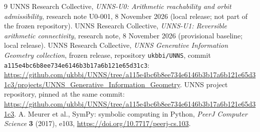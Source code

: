 \documentclass[11pt]{article}
\theoremstyle{definition}
\begin{document}
\begin{thebibliography}{9}\small
{} UNNS Research Collective, \emph{UNNS-U0: Arithmetic reachability and orbit admissibility}, research note U0-001, 8 November 2026
(local release; not part of the frozen repository).
 UNNS Research Collective, \emph{UNNS-U1: Reversible arithmetic connectivity}, research note, 8 November 2026
(provisional baseline; local release).
 UNNS Research Collective, \emph{UNNS Generative Information Geometry collection}, frozen release, repository \texttt{ukbbi/UNNS}, commit
\texttt{a115e4bc6b8ee734e6146b3b17a6b121e65d31c3}:
\url{https://github.com/ukbbi/UNNS/tree/a115e4bc6b8ee734e6146b3b17a6b121e65d31c3/projects/UNNS_Generative_Information_Geometry}.
 UNNS project repository, pinned at the same commit:
\url{https://github.com/ukbbi/UNNS/tree/a115e4bc6b8ee734e6146b3b17a6b121e65d31c3}.
 A. Meurer et al., SymPy: symbolic computing in Python, \emph{PeerJ Computer Science} \textbf{3} (2017), e103,
\url{https://doi.org/10.7717/peerj-cs.103}.
\end{thebibliography}
\end{document}
